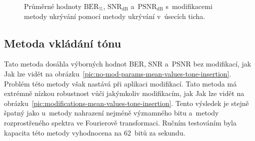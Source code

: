 \begin{figure}[H]
    \table
    \centering
    \caption{Průměrné hodnoty $\mathrm{BER}_{\%}$, $\mathrm{SNR}_\mathrm{dB}$
    a~$\mathrm{PSNR}_\mathrm{dB}$ s~modifikacemi metody ukrývání pomocí
    metody ukrývání v~úsecích ticha.}
    \label{pic:modifications-mean-values-silence-interval}
\end{figure}

\subsection*{Metoda vkládání tónu}

Tato metoda dosáhla výborných hodnot BER, SNR a~PSNR bez modifikací, jak Jak
lze vidět na obrázku~\ref{pic:no-mod-params-mean-values-tone-insertion}.
Problém této metody však nastává při aplikaci modifikací. Tato metoda má
extrémně nízkou robustnost vůči jakýmkoliv modifikacím, jak Jak lze vidět na
obrázku~\ref{pic:modifications-mean-values-tone-insertion}. Tento výsledek je
stejně špatný jako u~metody nahrazení nejméně významného bitu a~metody
rozprostřeného spektra ve Fourierově transformaci. Ručním testováním byla
kapacita této metody vyhodnocena na 62~bitů za sekundu.

